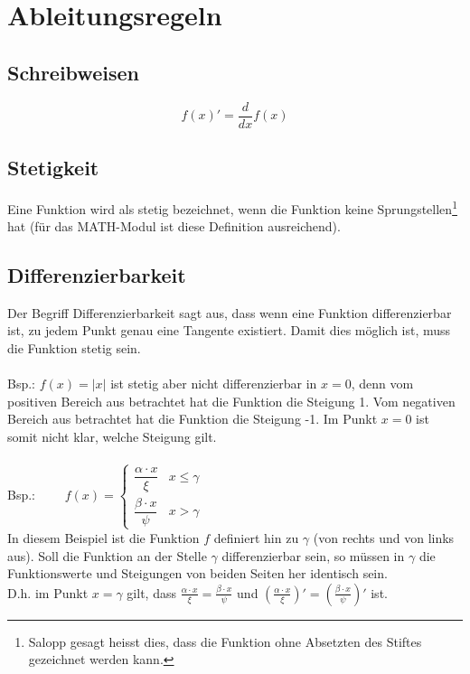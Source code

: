 \section{Ableitungsregeln}

\subsection{Schreibweisen}
\[ \boxed{f(x)' = \frac{d}{dx} f(x)} \]

\subsection{Stetigkeit}
Eine Funktion wird als stetig bezeichnet, wenn die Funktion keine 
Sprungstellen\footnote{Salopp gesagt heisst dies, dass die Funktion ohne Absetzten des Stiftes gezeichnet werden kann.}
hat (für das MATH-Modul ist diese Definition ausreichend).

\subsection{Differenzierbarkeit}
Der Begriff Differenzierbarkeit sagt aus, dass wenn eine Funktion
differenzierbar ist, zu jedem Punkt genau eine Tangente existiert. 
Damit dies möglich ist, muss die Funktion stetig sein.\\\\
Bsp.: $f(x)=|x|$ ist stetig aber nicht differenzierbar in $x=0$, 
denn vom positiven Bereich aus betrachtet hat die Funktion die Steigung 1.
Vom negativen Bereich aus betrachtet hat die Funktion die Steigung -1. 
Im Punkt $x=0$ ist somit nicht klar, welche Steigung gilt.\\\\
Bsp.: 
$ \quad \quad f(x) = \left\lbrace 
\begin{array}{ll}
	\dfrac{\alpha \cdot x}{\xi} & x \leq \gamma \\
	\dfrac{\beta \cdot x}{\psi}  & x > \gamma 
\end{array} \right.  $ \\
In diesem Beispiel ist die Funktion $f$ definiert hin zu $\gamma$ 
(von rechts und von links aus).
Soll die Funktion an der Stelle $\gamma$ differenzierbar sein, 
so müssen in $\gamma$ die Funktionswerte und Steigungen von beiden Seiten her
identisch sein. \\
D.h. im Punkt $x=\gamma$ gilt, dass 
$\frac{\alpha \cdot x}{\xi} = \frac{\beta \cdot x}{\psi}$ und
$\left(\frac{\alpha \cdot x}{\xi}\right)' = 
 \left(\frac{\beta \cdot x}{\psi} \right)'$ ist.

